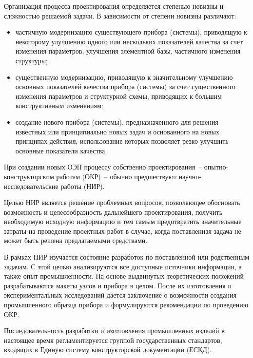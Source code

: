 
Организация процесса проектирования определяется степенью новизны и сложностью решаемой задачи. В зависимости от степени новизны различают:
\begin{itemize}
	\item частичную модернизацию существующего прибора (системы), приводящую к некоторому улучшению одного или нескольких показателей качества за счет изменения параметров, улучшения элементной базы, частичного изменения структуры;
	\item существенную модернизацию, приводящую к значительному улучшению основных показателей качества прибора (системы) за счет существенного изменения параметров и структурной схемы, приводящих к большим конструктивным изменениям;
	\item создание нового прибора (системы), предназначенного для решения известных или принципиально новых задач и основанного на новых принципах действия, использование которых позволяет резко улучшить основные показатели качества.
\end{itemize}

При создании новых ОЭП процессу собственно проектирования~-- опытно-конструкторским работам (ОКР)~-- обычно предшествуют научно-исследовательские работы (НИР).

Целью НИР является решение проблемных вопросов, позволяющее обосновать возможность и целесообразность дальнейшего проектирования, получить необходимую исходную информацию и тем самым предотвратить значительные затраты на проведение проектных работ в случае, когда поставленная задача не может быть решена предлагаемыми средствами.

В рамках НИР изучается состояние разработок по поставленной или родственным задачам. С этой целью анализируются все доступные источники информации, а также опыт промышленности. На основе выдвинутых теоретических положений разрабатываются макеты узлов и прибора в целом. После их изготовления и экспериментальных исследований дается заключение о возможности создания промышленного образца прибора и формулируются рекомендации по проведению ОКР.

Последовательность разработки и изготовления промышленных изделий в настоящее время регламентируется группой государственных стандартов, входящих в Единую систему конструкторской документации (ЕСКД).

